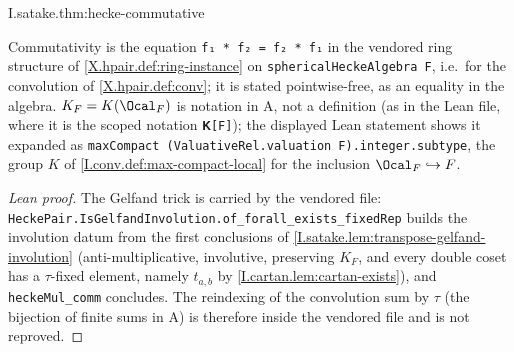 \begin{theorem}
\end{theorem}
\begin{tfformal}{I.satake.thm:hecke-commutative}
\begin{tffidelity}
Commutativity is the equation \texttt{f₁ * f₂ = f₂ * f₁} in the vendored ring structure of \cref{X.hpair.def:ring-instance} on \texttt{sphericalHeckeAlgebra F}, i.e.\ for the convolution of \cref{X.hpair.def:conv}; it is stated pointwise-free, as an equality in the algebra. $K_F=K(\Ocal_F)$ is notation in A, not a definition (as in the Lean file, where it is the scoped notation \texttt{𝐊[F]}); the displayed Lean statement shows it expanded as \texttt{maxCompact (ValuativeRel.valuation F).integer.subtype}, the group $K$ of \cref{I.conv.def:max-compact-local} for the inclusion $\Ocal_F\hookrightarrow F$.
\end{tffidelity}
\end{tfformal}
\begin{proof}[Lean proof]
The Gelfand trick is carried by the vendored file: \texttt{HeckePair.IsGelfandInvolution.of\_forall\_exists\_fixedRep} builds the involution datum from the first conclusions of \cref{I.satake.lem:transpose-gelfand-involution} (anti-multiplicative, involutive, preserving $K_F$, and every double coset has a $\tau$-fixed element, namely $t_{a,b}$ by \cref{I.cartan.lem:cartan-exists}), and \texttt{heckeMul\_comm} concludes. The reindexing of the convolution sum by $\tau$ (the bijection of finite sums in A) is therefore inside the vendored file and is not reproved.
\end{proof}


